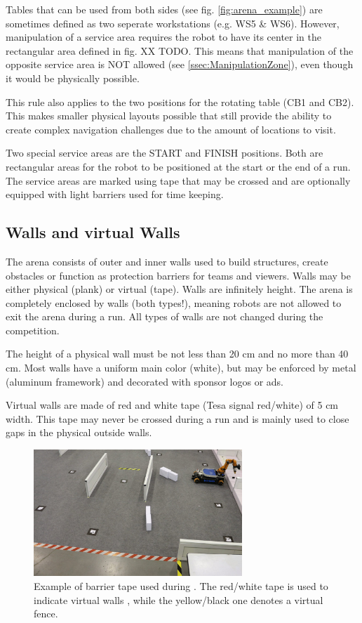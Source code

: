 Tables that can be used from both sides (see fig. \ref{fig:arena_example}) are sometimes defined as two seperate workstations (e.g. WS5 \& WS6). However, manipulation of a service area requires the robot to have its center in the rectangular area defined in fig. XX TODO. This means that manipulation of the opposite service area is NOT allowed (see \ref{ssec:ManipulationZone}), even though it would be physically possible.

This rule also applies to the two positions for the rotating table (CB1 and CB2).
This makes smaller physical layouts possible that still provide the ability to create complex navigation challenges due to the amount of locations to visit.

Two special service areas are the START and FINISH positions. Both are rectangular areas for the robot to be positioned at the start or the end of a run. The service areas are marked using tape that may be crossed and are optionally equipped with light barriers used for time keeping.


\subsection{Walls and virtual Walls}
\label{subsec: Walls and virtual Walls}

The arena consists of outer and inner walls used to build structures, create obstacles or function as protection barriers for teams and viewers. Walls may be either physical (plank) or virtual (tape). Walls are infinitely height.
The arena is completely enclosed by walls (both types!), meaning robots are not allowed to exit the arena during a run. All types of walls are not changed during the competition.

The height of a physical wall must be not less than 20 cm and no more than 40 cm.
Most walls have a uniform main color (white), but may be enforced by metal (aluminum framework) and decorated with sponsor logos or ads.

Virtual walls are made of red and white tape (Tesa signal red/white) of 5 cm width. This tape may never be crossed during a run and is mainly used to close gaps in the physical outside walls.

\begin{figure} [h!]
\centering
\includegraphics[width= 0.7\textwidth ]{./images/general_rules/barrier_tapes_in_china15.jpg}
\caption{Example of barrier tape used during . The red/white tape is used to indicate virtual walls , while the yellow/black one denotes a virtual fence.}
\label{fig:walls_and_virt_walls}
\end{figure}

